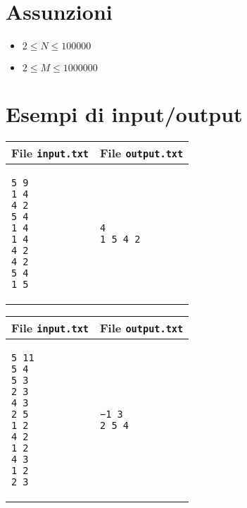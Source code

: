 \documentclass[a4paper,11pt]{article}
\begin{document}
  \section*{Assunzioni}
  \begin{itemize}

    \item $2 ≤ N ≤  100000$
    \item $2 ≤ M ≤ 1000000$
  \end{itemize}

\section*{Esempi di input/output}


    \noindent
    \begin{tabular}{p{11cm}|p{5cm}}
    \toprule
    \textbf{File \texttt{input.txt}}
    & \textbf{File \texttt{output.txt}}
    \\
    \midrule
    \scriptsize
    \begin{verbatim}
5 9
1 4
4 2
5 4
1 4
1 4
4 2
4 2
5 4
1 5
      \end{verbatim}
    &
    \scriptsize
    \begin{verbatim}
4
1 5 4 2
      \end{verbatim}
    \\
    \bottomrule
    \end{tabular}

    \noindent
    \begin{tabular}{p{11cm}|p{5cm}}
    \toprule
    \textbf{File \texttt{input.txt}}
    & \textbf{File \texttt{output.txt}}
    \\
    \midrule
    \scriptsize
    \begin{verbatim}
5 11
5 4
5 3
2 3
4 3
2 5
1 2
4 2
1 2
4 3
1 2
2 3
      \end{verbatim}
    &
    \scriptsize
    \begin{verbatim}
−1 3
2 5 4
      \end{verbatim}
    \\
    \bottomrule
    \end{tabular}
\end{document}
